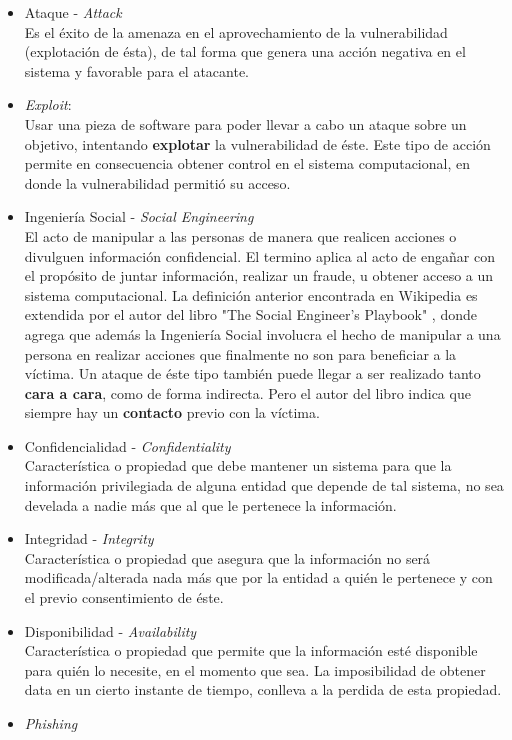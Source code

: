 \begin{itemize}
	\item Ataque - \textit{Attack}
		\\Es el éxito de la amenaza en el aprovechamiento de la vulnerabilidad (explotación de ésta), de tal forma que genera una acción negativa en el sistema y favorable para el atacante.
	\item \textit{Exploit}:
		\\Usar una pieza de software para poder llevar a cabo un ataque sobre un objetivo, intentando \textbf{explotar} la vulnerabilidad de éste. Este tipo de acción permite en consecuencia obtener control en el sistema computacional, en donde la vulnerabilidad permitió su acceso.
	\item Ingeniería Social - \textit{Social Engineering}
		\\El acto de manipular a las personas de manera que realicen acciones o divulguen información confidencial. El termino aplica al acto de engañar con el propósito de juntar información, realizar un fraude, u obtener acceso a un sistema computacional. La definición anterior encontrada en Wikipedia es extendida por el autor del libro "The Social Engineer's Playbook" \cite{socEngineeering}, donde agrega que además la Ingeniería Social involucra el hecho de manipular a una persona en realizar acciones que finalmente no son para beneficiar a la víctima. Un ataque de éste tipo también puede llegar a ser realizado tanto \textbf{cara a cara}, como de forma indirecta. Pero el autor del libro indica que siempre hay un \textbf{contacto} previo con la víctima.
	\item Confidencialidad - \textit{Confidentiality} 
		\\Característica o propiedad que debe mantener un sistema para que la información privilegiada de alguna entidad que depende de tal sistema, no sea develada a nadie más que al que le pertenece la información.
	\item Integridad - \textit{Integrity}
		\\Característica o propiedad que asegura que la información no será modificada/alterada nada más que por la entidad a quién le pertenece y con el previo consentimiento de éste.
	\item Disponibilidad - \textit{Availability}
		\\Característica o propiedad que permite que la información esté disponible para quién lo necesite, en el momento que sea. La imposibilidad de obtener data en un cierto instante de tiempo, conlleva a la perdida de esta propiedad.
	\item \textit{Phishing}

\end{itemize}
